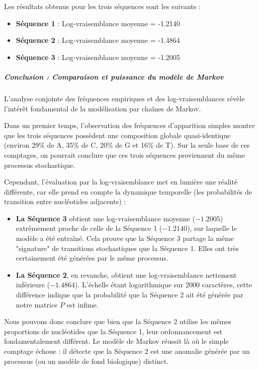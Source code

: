Les résultats obtenus pour les trois séquences sont les suivants :
\begin{itemize}
    \item \textbf{Séquence 1} : Log-vraisemblance moyenne = -1.2140
    \item \textbf{Séquence 2} : Log-vraisemblance moyenne = -1.4864
    \item \textbf{Séquence 3} : Log-vraisemblance moyenne = -1.2005
\end{itemize}

\subparagraph{Conclusion : Comparaison et puissance du modèle de Markov}

L'analyse conjointe des fréquences empiriques et des log-vraisemblances 
révèle l'intérêt fondamental de la modélisation par chaînes de Markov. 

Dans un premier temps, l'observation des fréquences d'apparition simples 
montre que les trois séquences possèdent une composition globale quasi-identique 
(environ 29\% de A, 35\% de C, 20\% de G et 16\% de T). Sur la seule 
base de ces comptages, on pourrait conclure que ces trois séquences proviennent 
du même processus stochastique.

Cependant, l'évaluation par la log-vraisemblance met en lumière une réalité différente, 
car elle prend en compte la dynamique temporelle (les probabilités de transition entre 
nucléotides adjacents) :
\begin{itemize}
    \item \textbf{La Séquence 3} obtient une log-vraisemblance moyenne ($-1.2005$) extrêmement proche de celle de la Séquence 1 ($-1.2140$), sur laquelle le modèle a été entraîné. Cela prouve que la Séquence 3 partage la même "signature" de transitions stochastiques que la Séquence 1. Elles ont très certainement été générées par le même processus.
    \item \textbf{La Séquence 2}, en revanche, obtient une log-vraisemblance nettement inférieure ($-1.4864$). L'échelle étant logarithmique sur 2000 caractères, cette différence indique que la probabilité que la Séquence 2 ait été générée par notre matrice $P$ est infime. 
\end{itemize}

Nous pouvons donc conclure que bien que la Séquence 2 utilise les mêmes proportions de 
nucléotides que la Séquence 1, leur ordonnancement est fondamentalement différent. 
Le modèle de Markov réussit là où le simple comptage échoue : il détecte que la 
Séquence 2 est une anomalie générée par un processus 
(ou un modèle de fond biologique) distinct.